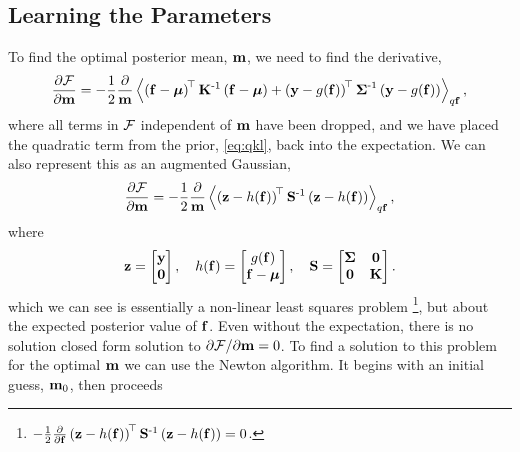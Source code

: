 \documentclass{article} %
\begin{document}
\subsection{Learning the Parameters}

To find the optimal posterior mean, $\pomean$, we need to find the derivative,
\begin{equation}
    \frac{\partial\Fengy}{\partial\pomean} = -\frac{1}{2}
    \frac{\partial}{\pomean} \expec{q\lstate}{
        \brac{\lstate - \prmean}\transpose\prcov\inv
        \brac{\lstate - \prmean}
        + \brac{\obs - \nonlin{\lstate}}\transpose \lcov\inv
            \brac{\obs - \nonlin{\lstate}}},
\end{equation}
where all terms in $\Fengy$ independent of $\pomean$ have been dropped, and we
have placed the quadratic term from the prior, \eqref{eq:qkl}, back into the
expectation. We can also represent this as an augmented Gaussian,
\begin{equation}
    \frac{\partial\Fengy}{\partial\pomean} = -\frac{1}{2}
        \frac{\partial}{\pomean}
        \expec{q\lstate}{
        \brac{\augobs - \augnonlin{\lstate}}\transpose\augcov\inv
        \brac{\augobs - \augnonlin{\lstate}}
    },
    \label{eq:augsys}
\end{equation}
where
\begin{equation}
    \augobs = \begin{bmatrix} \obs \\ \mathbf{0} \end{bmatrix}, \quad
    \augnonlin{\lstate} = \begin{bmatrix} \nonlin{\lstate} \\ \lstate - \prmean 
        \end{bmatrix}, \quad
    \augcov = \begin{bmatrix} \lcov & \mathbf{0} \\ \mathbf{0} & \prcov 
        \end{bmatrix}.
\end{equation}
which we can see is essentially a non-linear least squares problem\!
\footnote{$-\frac{1}{2}
        \frac{\partial}{\partial\lstate}
        \brac{\augobs - \augnonlin{\lstate}}\transpose\augcov\inv
        \brac{\augobs - \augnonlin{\lstate}} = 0$.}, but about
the expected posterior value of $\lstate$. Even without the expectation, there
is no solution closed form solution to $\partial\Fengy/\partial\pomean = 0$.
To find a solution to this problem for the optimal $\pomean$ we can use the
Newton algorithm. It begins with an initial guess, $\pomean_0$, then proceeds
\end{document}
